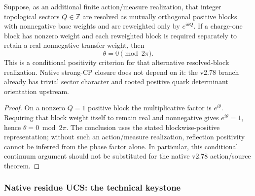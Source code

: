 \documentclass[12pt,a4paper]{article}
\begin{document}
\begin{lemma}
\label{p12:lem:theta-zero-os-selection}
Suppose, as an additional finite action/measure realization, that integer topological sectors \(Q\in\mathbb Z\) are resolved as mutually orthogonal positive blocks with nonnegative base weights and are reweighted only by \(e^{i\theta Q}\).  If a charge-one block has nonzero weight and each reweighted block is required separately to retain a real nonnegative transfer weight, then
\[
\theta=0\pmod{2\pi}.
\]
This is a conditional positivity criterion for that alternative resolved-block realization.  Native strong-CP closure does not depend on it: the v2.78 branch already has trivial sector character and rooted positive quark determinant orientation upstream.
\end{lemma}
\begin{proof}
On a nonzero \(Q=1\) positive block the multiplicative factor is \(e^{i\theta}\).  Requiring that block weight itself to remain real and nonnegative gives \(e^{i\theta}=1\), hence \(\theta=0\bmod2\pi\).  The conclusion uses the stated blockwise-positive representation; without such an action/measure realization, reflection positivity cannot be inferred from the phase factor alone.  In particular, this conditional continuum argument should not be substituted for the native v2.78 action/source theorem.
\end{proof}



\subsubsection{Native residue UCS: the technical keystone}
\label{p12:sec:qft10-subladder}
\end{document}
